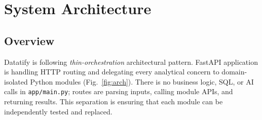 \documentclass[conference]{IEEEtran}
\begin{document}
\section{System Architecture}

\subsection{Overview}

Datatify is following \emph{thin-orchestration} architectural pattern. FastAPI application is handling HTTP routing and delegating every analytical concern to domain-isolated Python modules (Fig.~\ref{fig:arch}). There is no business logic, SQL, or AI calls in \texttt{app/main.py}; routes are parsing inputs, calling module APIs, and returning results. This separation is ensuring that each module can be independently tested and replaced.
\end{document}
